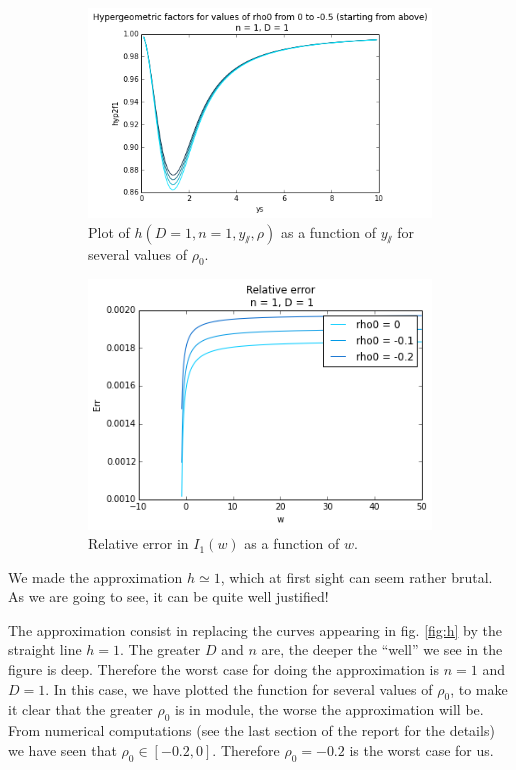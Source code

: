\begin{figure}[htp]
\centering
\begin{subfigure}{.5\textwidth}
	\centering
	\includegraphics[width=.9\linewidth]{img/approx/hyp2f1.png}
	\caption{Plot of $h(D=1,n=1,y_\sslash,\rho)$ as a function of $y_\sslash$ for several values of $\rho_0$.}
	\label{fig:h}
	\end{subfigure}%
\begin{subfigure}{.5\textwidth}
	\centering
	\includegraphics[width=.9\linewidth]{img/approx/relat_err.png}
	\caption{Relative error in $I_1(w)$ as a function of $w$.}
	\label{fig:I1}
\end{subfigure}
\caption{}
\label{fig:approx}
\end{figure}


We made the approximation $h \simeq 1$, which at first sight can seem rather brutal. As we are going to see, it can be quite well justified!

The approximation consist in replacing the curves appearing in fig. \eqref{fig:h} by the straight line $h = 1$. The greater $D$ and $n$ are, the deeper the ``well'' we see in the figure is deep. Therefore the worst case for doing the approximation is $n=1$ and $D=1$. In this case, we have plotted the function for several values of $\rho_0$, to make it clear that the greater $\rho_0$ is in module, the worse the approximation will be. From numerical computations (see the last section of the report for the details) we have seen that $\rho_0 \in [-0.2, 0]$. Therefore $\rho_0=-0.2$ is the worst case for us. 



